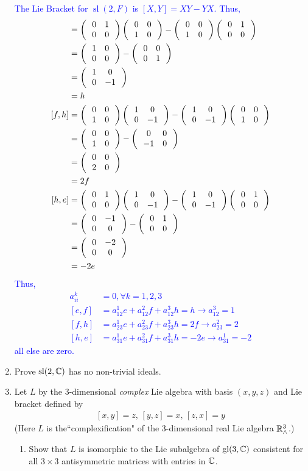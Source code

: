 \documentclass[12pt,a4paper]{report}
\newcommand{\BLUE}[1]{\textcolor{blue}{#1}}
\newcommand{\GL}{\operatorname{gl}}
\newcommand{\SL}{\operatorname{sl}}
\newcommand{\LB}[2]{\left [ #1,#2 \right ]}
\begin{document}
\begin{enumerate}[label=\textit{1.\arabic*}]
\BLUE{The Lie Bracket for $\SL(2,F)$ is $\LB{X}{Y} = XY-YX$.  Thus,
\begin{align*}
	[e,f] &= \TWOXTWO{0}{1}{0}{0}\TWOXTWO{0}{0}{1}{0} - \TWOXTWO{0}{0}{1}{0} \TWOXTWO{0}{1}{0}{0}\\
	&= \TWOXTWO{1}{0}{0}{0}-\TWOXTWO{0}{0}{0}{1} \\
	&= \TWOXTWO{1}{0}{0}{-1} \\
	&= h\\
	[f,h] &= \TWOXTWO{0}{0}{1}{0}\TWOXTWO{1}{0}{0}{-1} - \TWOXTWO{1}{0}{0}{-1}\TWOXTWO{0}{0}{1}{0} \\
	&= \TWOXTWO{0}{0}{1}{0}-\TWOXTWO{0}{0}{-1}{0}\\
	&= \TWOXTWO{0}{0}{2}{0} \\
	&= 2f \\
	[h,e] &= \TWOXTWO{0}{1}{0}{0}\TWOXTWO{1}{0}{0}{-1}-\TWOXTWO{1}{0}{0}{-1} \TWOXTWO{0}{1}{0}{0}\\
	&= \TWOXTWO{0}{-1}{0}{0}-\TWOXTWO{0}{1}{0}{0}\\
	&= \TWOXTWO{0}{-2}{0}{0} \\
	&= -2e
\end{align*}Thus, 
\begin{align*}
	a_{ii}^k &= 0, \forall k=1,2,3\\
	[e,f] &= a_{12}^1e + a_{12}^2f+a_{12}^3h = h \to a_{12}^3=1 \\
	[f,h] &= a_{23}^1e + a_{23}^2f+a_{23}^3h = 2f \to a_{23}^2 = 2\\
	[h,e] &= a_{31}^1e + a_{31}^2f+a_{31}^3h = -2e \to  a_{31}^1=-2
\end{align*}all else are zero.
}

\item Prove $\SL(2,\C)$ has no non-trivial ideals.
\newcommand{\ASYM}[3]{\THREEXTHREE{0}{#1}{#2}{-#1}{0}{#3}{-#2}{-#3}{0}}

\item Let $L$ by the 3-dimensional \textit{complex} Lie algebra with basis $(x,y,z)$ and Lie bracket defined by 
\begin{align*}
	\LB{x}{y} =z,\, \LB{y}{z} = x,\, \LB{z}{x}=y
\end{align*}(Here $L$ is the``complexification" of the 3-dimensional real Lie algebra $\mathbb{R}_\wedge^3$.)
\begin{enumerate}[label=(\roman*)]
	\item Show that $L$ is isomorphic to the Lie subalgebra of $\GL(3,\C)$ consistent for all $3 \times 3$ antisymmetric matrices with entries in $\mathbb{C}$.
	

\end{enumerate}
\end{enumerate}
\end{document}
